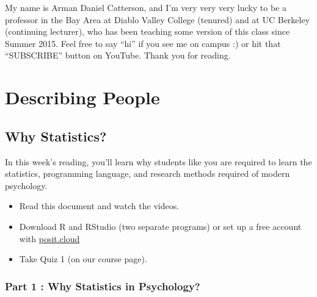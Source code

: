 \documentclass[
  letterpaper,
  DIV=11,
  numbers=noendperiod,
  oneside]{scrreprt}
\begin{document}

My name is Arman Daniel Catterson, and I'm very very very lucky to be a
professor in the Bay Area at Diablo Valley College (tenured) and at UC
Berkeley (continuing lecturer), who has been teaching some version of
this class since Summer 2015. Feel free to say ``hi'' if you see me on
campus :) or hit that ``SUBSCRIBE'' button on YouTube. Thank you for
reading.

\part{Describing People}

\chapter{Why Statistics?}\label{why-statistics}

In this week's reading, you'll learn why students like you are required
to learn the statistics, programming language, and research methods
required of modern psychology.

\begin{tcolorbox}[enhanced jigsaw, toptitle=1mm, toprule=.15mm, rightrule=.15mm, breakable, left=2mm, colbacktitle=quarto-callout-important-color!10!white, colback=white, opacityback=0, coltitle=black, bottomtitle=1mm, opacitybacktitle=0.6, titlerule=0mm, leftrule=.75mm, arc=.35mm, bottomrule=.15mm, title=\textcolor{quarto-callout-important-color}{\faExclamation}\hspace{0.5em}{To-Do List (due before our next lecture)}, colframe=quarto-callout-important-color-frame]

\begin{itemize}
\item
  Read this document and watch the videos.
\item
  Download R and RStudio (two separate programs) or set up a free
  account with \url{posit.cloud}
\item
  Take Quiz 1 (on our course page).
\end{itemize}

\end{tcolorbox}

\section{Part 1 : Why Statistics in
Psychology?}\label{part-1-why-statistics-in-psychology}
\end{document}
